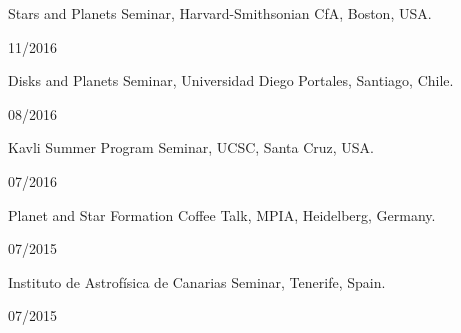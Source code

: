\documentclass[12pt, a4paper]{article} %
\begin{document}
\begin{minipage}[t]{0.7\textwidth}
\begin{flushleft}%
  \setlength{\leftskip}{0.2cm}%
Stars and Planets Seminar, Harvard-Smithsonian CfA, Boston, USA.
\end{flushleft}
\end{minipage}
\begin{minipage}[t]{0.3\textwidth}
\hfill 11/2016
\end{minipage}
\vspace{0.2cm}


\begin{minipage}[t]{0.7\textwidth}
\begin{flushleft}%
  \setlength{\leftskip}{0.2cm}%
Disks and Planets Seminar, Universidad Diego Portales, Santiago, Chile.
\end{flushleft}
\end{minipage}
\begin{minipage}[t]{0.3\textwidth}
\hfill 08/2016
\end{minipage}
\vspace{0.2cm}

\begin{minipage}[t]{0.7\textwidth}
\begin{flushleft}%
  \setlength{\leftskip}{0.2cm}%
Kavli Summer Program Seminar, UCSC, Santa Cruz, USA.
\end{flushleft}
\end{minipage}
\begin{minipage}[t]{0.3\textwidth}
\hfill 07/2016
\end{minipage}
\vspace{0.2cm}

\begin{minipage}[t]{0.7\textwidth}
\begin{flushleft}%
  \setlength{\leftskip}{0.2cm}%
Planet and Star Formation Coffee Talk, MPIA,  Heidelberg, Germany.
\end{flushleft}
\end{minipage}
\begin{minipage}[t]{0.3\textwidth}
\hfill 07/2015
\end{minipage}
\vspace{0.2cm}

\begin{minipage}[t]{0.7\textwidth}
\begin{flushleft}%
  \setlength{\leftskip}{0.2cm}%
Instituto de Astrof\'isica de Canarias Seminar, Tenerife, Spain.
\end{flushleft}
\end{minipage}
\begin{minipage}[t]{0.3\textwidth}
\hfill 07/2015
\end{minipage}
\vspace{0.2cm}
\end{document}
